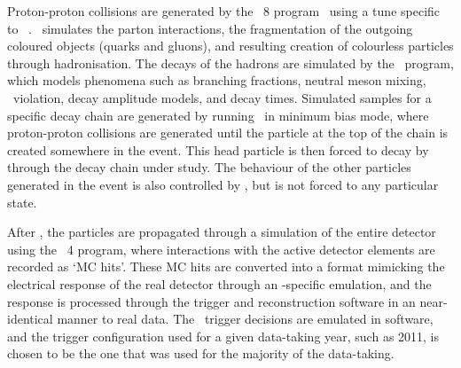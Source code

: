 Proton-proton collisions are generated by the \pythia\ 8 
program~\cite{Sjostrand:2007gs} using a tune specific to 
\lhcb~\cite{Belyaev:1322400}.
\pythia\ simulates the parton interactions, the fragmentation of the outgoing 
coloured objects (quarks and gluons), and resulting creation of colourless 
particles through hadronisation.
The decays of the hadrons are simulated by the \evtgen\ program, which models 
phenomena such as branching fractions, neutral meson mixing, \CP\ violation, 
decay amplitude models, and decay times.
Simulated samples for a specific decay chain are generated by running \pythia\ 
in minimum bias mode, where proton-proton collisions are generated until the 
particle at the top of the chain is created somewhere in the event.
This head particle is then forced to decay by \evtgen~\cite{Clemencic:2011zza} 
through the decay chain under study.
The behaviour of the other particles generated in the event is also controlled 
by \evtgen, but is not forced to any particular state.

After \evtgen, the particles are propagated through a simulation of the entire 
detector using the \geant\ 4 program, where interactions with the active 
detector elements are recorded as `\ac{MC} hits'.
These \ac{MC} hits are converted into a format mimicking the electrical 
response of the real detector through an \lhcb-specific emulation, and the 
response is processed through the trigger and reconstruction software in an 
near-identical manner to real data.
The \lzero\ trigger decisions are emulated in software, and the trigger 
configuration used for a given data-taking year, such as 2011, is chosen to be 
the one that was used for the majority of the data-taking.

